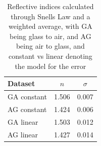 \begin{table}[!ht]
    \caption{Reflective indices calculated through Snells Law and a weighted average, with GA being glass to air, and AG being air to glass, and constant vs linear denoting the model for the error}
    \centering
    \begin{tabular}{lcc}
        \hline\hline
        Dataset & $n$ & $\sigma$ \\
        \hline
        \rule{0pt}{1.1em}\noindent
        GA constant & 1.506 & 0.007 \\
        AG constant & 1.424 & 0.006 \\
        GA linear & 1.503 & 0.012 \\
        AG linear & 1.427 & 0.014 \\
        \hline
    \end{tabular}
\end{table}

\newpage
